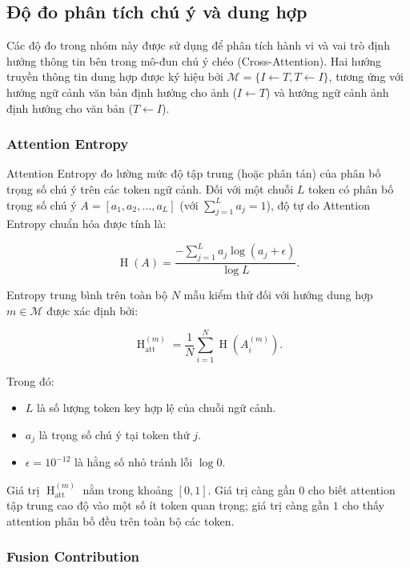 \subsection{Độ đo phân tích chú ý và dung hợp}

Các độ đo trong nhóm này được sử dụng để phân tích hành vi và vai trò định hướng thông tin bên trong mô-đun chú ý chéo (Cross-Attention). Hai hướng truyền thông tin dung hợp được ký hiệu bởi $\mathcal{M}=\{I\leftarrow T, T\leftarrow I\}$, tương ứng với hướng ngữ cảnh văn bản định hướng cho ảnh ($I\leftarrow T$) và hướng ngữ cảnh ảnh định hướng cho văn bản ($T\leftarrow I$).
\subsubsection{Attention Entropy}

Attention Entropy \cite{Jain2019AttentionNotExplanation,Abnar2020AttentionFlow} đo lường mức độ tập trung (hoặc phân tán) của phân bố trọng số chú ý trên các token ngữ cảnh. Đối với một chuỗi $L$ token có phân bố trọng số chú ý $A = [a_1, a_2, \dots, a_L]$ (với $\sum_{j=1}^L a_j = 1$), độ tự do Attention Entropy chuẩn hóa được tính là:

\begin{equation}
    \operatorname{H}(A) = \frac{-\sum_{j=1}^{L} a_j \log(a_j + \epsilon)}{\log L}.
\end{equation}

Entropy trung bình trên toàn bộ $N$ mẫu kiểm thử đối với hướng dung hợp $m \in \mathcal{M}$ được xác định bởi:

\begin{equation}
    \operatorname{H}_{\mathrm{att}}^{(m)} = \frac{1}{N} \sum_{i=1}^{N} \operatorname{H}\left(A_i^{(m)}\right).
    \label{eq:ch4_attention_entropy}
\end{equation}

Trong đó:
\begin{itemize}
    \item $L$ là số lượng token key hợp lệ của chuỗi ngữ cảnh.
    \item $a_j$ là trọng số chú ý tại token thứ $j$.
    \item $\epsilon = 10^{-12}$ là hằng số nhỏ tránh lỗi $\log 0$.
\end{itemize}
Giá trị $\operatorname{H}_{\mathrm{att}}^{(m)}$ nằm trong khoảng $[0, 1]$. Giá trị càng gần $0$ cho biết attention tập trung cao độ vào một số ít token quan trọng; giá trị càng gần $1$ cho thấy attention phân bố đều trên toàn bộ các token.
\subsubsection{Fusion Contribution}

